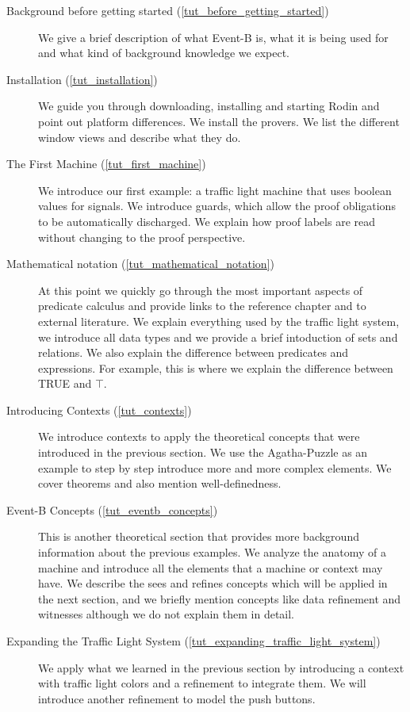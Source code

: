 \begin{description}
	\item[Background before getting started (\ref{tut_before_getting_started})] We give a brief description of what Event-B is, what it is being used for and what kind of background knowledge we expect.
	\item[Installation (\ref{tut_installation})] We guide you through downloading, installing and starting Rodin and point out platform differences.  We install the provers.  We list the different window views and describe what they do.
	\item[The First Machine (\ref{tut_first_machine})] We introduce our first example: a traffic light machine that uses boolean values for signals.  We introduce guards, which allow the proof obligations to be automatically discharged.  We explain how proof labels are read without changing to the proof perspective.
	\item[Mathematical notation (\ref{tut_mathematical_notation})] At this point we quickly go through the most important aspects of predicate calculus and provide links to the reference chapter and to external literature.  We explain everything used by the traffic light system, we introduce all data types and we provide a brief intoduction of sets and relations.  We also explain the difference between predicates and expressions. For example, this is where we explain the difference between TRUE and $\top$.  
	\item[Introducing Contexts (\ref{tut_contexts})] We introduce contexts to apply the theoretical concepts that were introduced in the previous section.  We use the Agatha-Puzzle as an example to step by step introduce more and more complex elements.  We cover theorems and also mention well-definedness.
	\item[Event-B Concepts (\ref{tut_eventb_concepts})] This is another theoretical section that provides more background information about the previous examples.  We analyze the anatomy of a machine and introduce all the elements that a machine or context may have. We describe the sees and refines concepts which will be applied in the next section, and we briefly mention concepts like data refinement and witnesses although we do not explain them in detail.
	\item[Expanding the Traffic Light System (\ref{tut_expanding_traffic_light_system})]  We apply what we learn\-ed in the previous section by introducing a context with traffic light colors and a refinement to integrate them.  We will introduce another refinement to model the push buttons.

\end{description}
